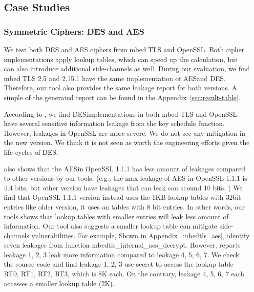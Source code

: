\subsection{Case Studies}

\subsubsection{Symmetric Ciphers: DES and AES}\label{eval:sym}
We test both DES and AES ciphers from mbed TLS and OpenSSL. Both cipher
implementations apply lookup tables, which can
speed up the calculation, but can also introduce additional side-channels
as well. During our evaluation, we find mbed TLS 2.5 and 2.15.1 have the same
implementation of AES\@ and DES\@. Therefore, our tool also provides the same 
leakage report for both
versions. A simple of the generated report can be found in the Appendix~\ref{sec:result-table}.

According to \tool{}, we find DES\@ implementations in both mbed TLS and OpenSSL have several
sensitive information leakage from the key schedule function.
However, leakages in OpenSSL are more severe. We do not see any mitigation
in the new version. We think it is not seen as worth the engineering
efforts given the life cycles of DES\@.

\tool{} also shows that the AES\@ in OpenSSL 1.1.1 
has less amount of leakages compared to other versions by our tools. 
(e.g., the max leakage of AES in OpenSSL 1.1.1 is 4.4 bits, but other version
have leakages that can leak can around 10 bits. )
We find that OpenSSL 1.1.1 version 
instead uses the 1KB lookup tables with 32bit entries like older version, it uses an 
tables with 8 bit entries. In other words, our tools shows that lookup tables with smaller 
entries will leak less amount of information. Our tool also suggests a smaller lookup
table can mitigate side-channels vulnerabilities. For example, Shown in Appendix~\ref{mbedtls_aes},
\tool{} identify seven leakages from function \textsf{mbedtls\_internal\_aes\_decrypt}.
However, \tool{} reports leakage 1, 2, 3 leak more information
compared to leakage 4, 5, 6, 7. 
We check the source code and find leakage 1, 2,
3 use secret to access the lookup table \textsf{RT0, RT1, RT2, RT3}, which is 8K
each. On the contrary, leakage 4, 5, 6, 7 each accesses a smaller lookup table
(2K).


